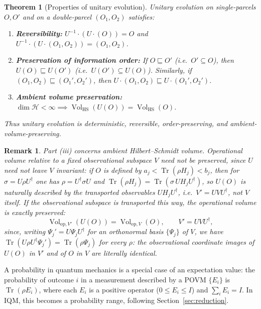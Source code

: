 \documentclass[11pt, onecolumn]{article}
\newtheorem{theorem}{Theorem}
\newtheorem{remark}{Remark}
\begin{document}
\begin{theorem}[Properties of unitary evolution]
\label{thm:unitary-evolution}
Unitary evolution on single-parcels \(O,O'\) and on a double-parcel \((O_1,O_2)\) satisfies:
\begin{enumerate}
    \item \textbf{Reversibility:} \(U^{-1}\cdot(U\cdot(O))=O\) and \(U^{-1}\cdot(U\cdot(O_1,O_2))=(O_1,O_2)\).
    \item \textbf{Preservation of information order:} If \(O\sqsubseteq O'\) (i.e.\ \(O'\subseteq O\)), then \(U(O)\sqsubseteq U(O')\) (i.e.\ \(U(O')\subseteq U(O)\)). Similarly, if \((O_1,O_2)\sqsubseteq (O_1',O_2')\), then \(U\cdot(O_1,O_2)\sqsubseteq U\cdot(O_1',O_2')\).
    \item \textbf{Ambient volume preservation:} $\dim\mathcal H<\infty \implies \operatorname{Vol}_{\mathrm{HS}}(U(O)) = \operatorname{Vol}_{\mathrm{HS}}(O)$.
\end{enumerate}
Thus unitary evolution is deterministic, reversible, order-preserving, and ambient-volume-preserving.
\end{theorem}

\begin{remark}
Part (iii) concerns ambient Hilbert--Schmidt volume. Operational volume relative to a fixed observational subspace $V$ need not be preserved, since $U$ need not leave $V$ invariant: if $O$ is defined by $a_j<\operatorname{Tr}(\rho H_j)<b_j$, then for $\sigma=U\rho U^\dagger$ one has $\rho=U^\dagger\sigma U$ and $\operatorname{Tr}(\rho H_j)=\operatorname{Tr}(\sigma\,UH_jU^\dagger)$, so $U(O)$ is naturally described by the transported observables $UH_jU^\dagger$, i.e.\ $V'=UVU^\dagger$, not $V$ itself. If the observational subspace is transported this way, the operational volume is exactly preserved:
\[
\operatorname{Vol}_{\mathrm{op},V'}(U(O))=\operatorname{Vol}_{\mathrm{op},V}(O),
\qquad V'=UVU^\dagger,
\]
since, writing $\Psi_j'=U\Psi_jU^\dagger$ for an orthonormal basis $\{\Psi_j\}$ of $V$, we have $\operatorname{Tr}(U\rho U^\dagger\Psi_j')=\operatorname{Tr}(\rho\Psi_j)$ for every $\rho$: the observational coordinate images of $U(O)$ in $V'$ and of $O$ in $V$ are literally identical.
\end{remark}

A probability in quantum mechanics is a special case of an expectation value: the probability of outcome \(i\) in a measurement described by a POVM \(\{E_i\}\) is \(\operatorname{Tr}(\rho E_i)\), where each \(E_i\) is a positive operator (\(0\le E_i\le I\)) and \(\sum_i E_i=I\). In IQM, this becomes a probability range, following Section~\ref{sec:reduction}.
\end{document}
